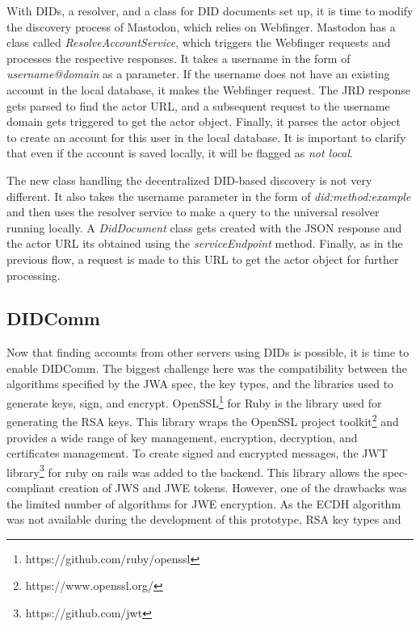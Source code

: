With DIDs, a resolver, and a class for DID documents set up, it is time to modify the discovery process of Mastodon, which relies on Webfinger. Mastodon has a class called \emph{ResolveAccountService}, which triggers the Webfinger requests and processes the respective responses. It takes a username in the form of \emph{username@domain} as a parameter. If the username does not have an existing account in the local database, it makes the Webfinger request. The JRD response gets parsed to find the actor URL, and a subsequent request to the username domain gets triggered to get the actor object. Finally, it parses the actor object to create an account for this user in the local database. It is important to clarify that even if the account is saved locally, it will be flagged as \emph{not local}. 

The new class handling the decentralized DID-based discovery is not very different. It also takes the username parameter in the form of \emph{did:method:example} and then uses the resolver service to make a query to the universal resolver running locally. A \emph{DidDocument} class gets created with the JSON response and the actor URL its obtained using the \emph{serviceEndpoint} method. Finally, as in the previous flow, a request is made to this URL to get the actor object for further processing.

\subsection{DIDComm}

Now that finding accounts from other servers using DIDs is possible, it is time to enable DIDComm. The biggest challenge here was the compatibility between the algorithms specified by the JWA spec, the key types, and the libraries used to generate keys, sign, and encrypt. OpenSSL\footnote{https://github.com/ruby/openssl} for Ruby is the library used for generating the RSA keys. This library wraps the OpenSSL project toolkit\footnote{https://www.openssl.org/} and provides a wide range of key management, encryption, decryption, and certificates management. To create signed and encrypted messages, the JWT library\footnote{https://github.com/jwt} for ruby on rails was added to the backend. This library allows the spec-compliant creation of JWS and JWE tokens. However, one of the drawbacks was the limited number of algorithms for JWE encryption. As the ECDH algorithm was not available during the development of this prototype, RSA key types and 

